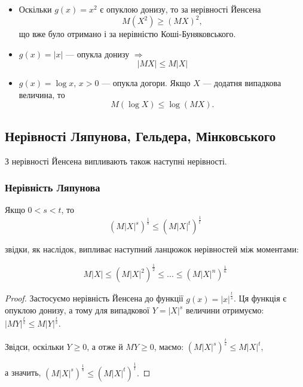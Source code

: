 \begin{itemize}
    \item Оскільки $g(x) = x^2$ є опуклою донизу, то
        за нерівності Йенсена
        $$M(X^2) \geqslant (MX)^2,$$
        що вже було отримано і за нерівністю
        Коші-Буняковського.
    
    \item $g(x) = |x|$ --- опукла донизу $\Rightarrow$
    \begin{equation}
        |MX| \leqslant M|X|    
    \end{equation}

    \item $g(x) = \log x$, $x > 0$ --- опукла догори. 
        Якщо $X$ --- додатня випадкова величина, то
        \begin{equation}
            M(\log X) \leqslant \log(MX).
        \end{equation}
\end{itemize}

\subsection{Нерівності Ляпунова, Гельдера, Мінковського}

З нерівності Йенсена випливають також наступні нерівності.

\subsubsection{Нерівність Ляпунова}

\begin{theorem}
    Якщо $0 < s < t$, то
    \begin{equation}
        (M|X|^s)^\frac{1}{s} \leqslant (M|X|^t)^\frac{1}{t}
    \end{equation}
    
    звідки, як наслідок, випливає наступний ланцюжок
    нерівностей між моментами:
    
    \begin{equation}
        M|X| \leqslant (M|X|^2)^\frac{1}{2} \leqslant ... \leqslant (M|X|^n)^\frac{1}{n} 
    \end{equation}
\end{theorem}
\begin{proof}
    Застосуємо нерівність Йенсена до функції $g(x) = |x|^{\frac{t}{s}}$.
    Ця функція є опуклою донизу, а тому для випадкової
    $Y = |X|^s$ величини  отримуємо:
    $|MY|^{\frac{t}{s}} \leqslant M|Y|^{\frac{t}{s}}.$

    Звідси, оскільки $Y \geqslant 0$, а отже й
    $MY \geqslant 0$, маємо:
    $(M|X|^s)^{\frac{t}{s}} \leqslant M|X|^t,$

    а значить,
    $(M|X|^s)^{\frac{1}{s}} \leqslant (M|X|^t)^{\frac{1}{t}}.$
\end{proof}


